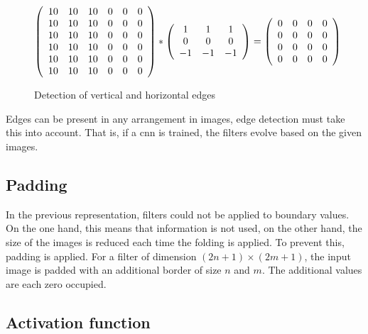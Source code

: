 {\begin{figure}
$$
\left(
\begin{array}{ccc ccc}
    10 & 10 & 10 & 0 & 0 & 0 \\
    10 & 10 & 10 & 0 & 0 & 0 \\
    10 & 10 & 10 & 0 & 0 & 0 \\
    10 & 10 & 10 & 0 & 0 & 0 \\
    10 & 10 & 10 & 0 & 0 & 0 \\
    10 & 10 & 10 & 0 & 0 & 0 \\
\end{array}
\right)
\ast
\left(
\begin{array}{ccc}
    1 &  1 &  1 \\
    0 &  0 &  0 \\
    -1 & -1 & -1 \\
\end{array}
\right)
=
\left(
\begin{array}{cccc}
    0 & 0 & 0 & 0 \\
    0 & 0 & 0 & 0 \\
    0 & 0 & 0 & 0 \\
    0 & 0 & 0 & 0 \\
\end{array}
\right)
$$
  \caption{Detection of vertical and horizontal edges}
\end{figure}

Edges can be present in any arrangement in images, edge detection must take this into account. That is, if a \ac{cnn} is trained, the filters evolve based on the given images. 



\subsection{Padding}

In the previous representation, filters could not be applied to boundary values. On the one hand, this means that information is not used, on the other hand, the size of the images is reduced each time the folding is applied. To prevent this, padding is applied. For a filter of dimension $(2n+1) \times (2m+1)$, the input image is padded with an additional border of size
$n$ and $m$. The additional values are each zero occupied.



\subsection{Activation function}\label{subsec:activation}

}
